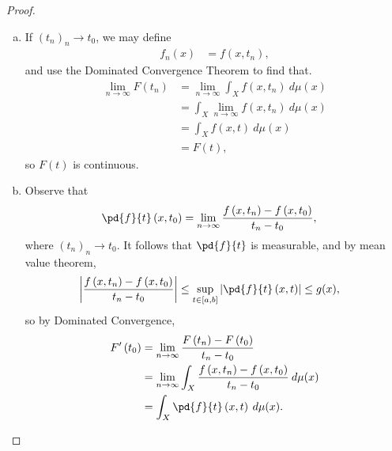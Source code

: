 \documentclass[10pt]{mypackage}
\begin{document}
\begin{proof}\hfill
  \begin{enumerate}[(a)]
    \item If $\left( t_n \right)_n\rightarrow t_0$, we may define
      \begin{align*}
        f_n\left( x \right) &= f\left( x,t_n \right),
      \end{align*}
      and use the Dominated Convergence Theorem to find that.
      \begin{align*}
        \lim_{n\rightarrow\infty} F\left( t_n \right) &= \lim_{n\rightarrow\infty}\int_{X}^{} f\left( x,t_n \right)\:d\mu(x)\\
                                                      &= \int_{X}^{} \lim_{n\rightarrow\infty}f\left( x,t_n \right)\:d\mu(x)\\
                                                      &= \int_{X}^{} f\left( x,t \right)\:d\mu(x)\\
                                                      &= F\left( t \right),
      \end{align*}
      so $F\left( t \right)$ is continuous.
    \item Observe that
      \begin{align*}
        \pd{f}{t} \left( x,t_0 \right) &= \lim_{n\rightarrow\infty} \frac{f\left( x,t_n \right)-f\left( x,t_0 \right)}{t_n-t_0},
      \end{align*}
      where $\left( t_n \right)_n\rightarrow t_0$. It follows that $\pd{f}{t}$ is measurable, and by mean value theorem,
      \begin{align*}
        \left\vert \frac{f\left( x,t_n \right)-f\left( x,t_0 \right)}{t_n-t_0} \right\vert &\leq \sup_{t\in [a,b]} \left\vert \pd{f}{t}\left( x,t \right) \right\vert \leq g(x),
      \end{align*}
      so by Dominated Convergence,
      \begin{align*}
        F'\left( t_0 \right) &= \lim_{n\rightarrow\infty} \frac{F\left( t_n \right) - F\left( t_0 \right)}{t_n-t_0}\\
                             &= \lim_{n\rightarrow\infty} \int_{X}^{} \frac{f\left( x,t_n \right)-f\left( x,t_0 \right)}{t_n-t_0}\:d\mu(x)\\
                             &= \int_{X}^{} \pd{f}{t}\left( x,t \right)\:d\mu(x).
      \end{align*}
  \end{enumerate}
\end{proof}
\end{document}
